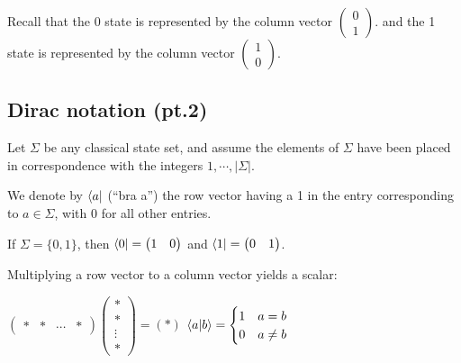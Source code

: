 \begin{note}
    Recall that the 0 state is represented by the column vector
    $\begin{pmatrix}
        0 \\
        1
    \end{pmatrix}$.
    and the 1 state is represented by the column vector
    $\begin{pmatrix}
        1 \\
        0
    \end{pmatrix}$.
\end{note}

\subsection{Dirac notation (pt.2)}
Let $\Sigma$ be any classical state set, and assume the elements of $\Sigma$ have been placed in correspondence with the integers $1,\cdots,|\Sigma|$.

\bigbreak

We denote by $\bra{a}$ (``bra a'') the row vector having a 1 in the entry corresponding to $a\in\Sigma$, with 0 for all other entries.

\bigbreak

If $\Sigma=\{0,1\}$, then $\bra{0}=
\begin{pmatrix}
    1 & 0
\end{pmatrix}$
and $\bra{1}=
\begin{pmatrix}
    0 & 1
\end{pmatrix}$.

\newpage

Multiplying a row vector to a column vector yields a scalar:
\begin{center}
    $\begin{pmatrix}
        * & * & \cdots & *
    \end{pmatrix}
    \begin{pmatrix}
        * \\
        * \\
        \vdots \\
        *
    \end{pmatrix}
    =
    (*)$
    \bigbreak
    $
    \braket{a|b}=
    \begin{cases}
    1 & a=b \\
    0 & a\neq b
    \end{cases}$
\end{center}

